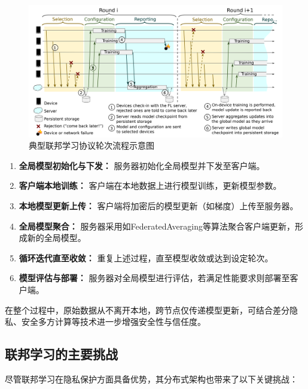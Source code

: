 \begin{figure}[htbp]
    \centering
    \includegraphics[width=\textwidth]{Imgs/FL-Learning-Protocol.png}
    \caption{典型联邦学习协议轮次流程示意图\cite{bonawitz2019towards}}
    \label{fig:fl_protocol_round}
\end{figure}

\begin{enumerate}[label=(\roman*)]%
    \item \textbf{全局模型初始化与下发：} 服务器初始化全局模型并下发至客户端。
    \item \textbf{客户端本地训练：} 客户端在本地数据上进行模型训练，更新模型参数。
    \item \textbf{本地模型更新上传：} 客户端将加密后的模型更新（如梯度）上传至服务器。
    \item \textbf{全局模型聚合：} 服务器采用如FederatedAveraging等算法聚合客户端更新，形成新的全局模型。
    \item \textbf{循环迭代直至收敛：} 重复上述过程，直至模型收敛或达到设定轮次。
    \item \textbf{模型评估与部署：} 服务器对全局模型进行评估，若满足性能要求则部署至客户端。
\end{enumerate}

在整个过程中，原始数据从不离开本地，跨节点仅传递模型更新，可结合差分隐私、安全多方计算等技术进一步增强安全性与信任度。

\subsection{联邦学习的主要挑战}
尽管联邦学习在隐私保护方面具备优势，其分布式架构也带来了以下关键挑战\cite{zhu2023blockchain,li2020federated}：

